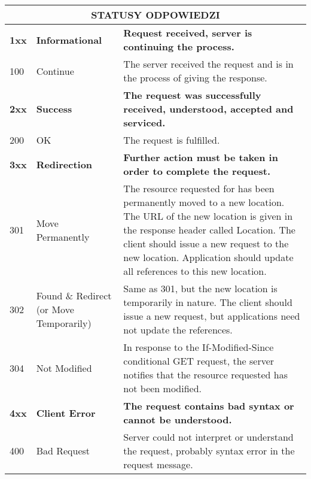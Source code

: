 \documentclass[../main.tex]{subfiles}
\begin{document}
    \begin{table}[H]
        \begin{center}
            \begin{tabular}{|p{3cm}|p{4cm}|p{8cm}|}
                \hline
                \multicolumn{3}{|c|}{\textbf{STATUSY ODPOWIEDZI}}\\
                \hline
                \hline
                \textbf{1xx} & \textbf{Informational} & \textbf{Request received, server is continuing the process.}\\
                \hline
                100 & Continue & The server received the request and is in the process of giving the response.\\
                \hline
                \hline
                \textbf{2xx} & \textbf{Success}
                & \textbf{The request was successfully received, understood, accepted and serviced.}\\
                \hline
                200 & OK & The request is fulfilled.\\
                \hline
                \hline
                \textbf{3xx} &
                \textbf{Redirection} &
                \textbf{Further action must be taken in order to complete the request.}\\
                \hline
                301 & Move Permanently & The resource requested for has been permanently moved to a new location. The URL of the new location is given in the response header called Location. The client should issue a new request to the new location. Application should update all references to this new location.\\
                \hline
                302 & Found \& Redirect (or Move Temporarily) & Same as 301, but the new location is temporarily in nature. The client should issue a new request, but applications need not update the references.\\
                \hline
                304 & Not Modified& In response to the If-Modified-Since conditional GET request, the server notifies that the resource requested has not been modified.\\
                \hline
                \hline
                \textbf{4xx} &\textbf{Client Error} &
                \textbf{The request contains bad syntax or cannot be understood.}\\
                \hline
                400 & Bad Request & Server could not interpret or understand the request, probably syntax error in the request message.\\

\end{tabular}
\end{center}
\end{table}
\end{document}
